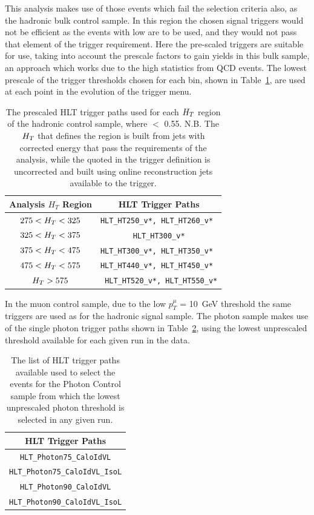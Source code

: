 This analysis makes use of those events which fail the \alt selection criteria also, as the hadronic bulk control sample. In this region the chosen signal triggers would not be efficient as the events with low \MHT are to be used, and they would not pass that element of the trigger requirement. Here the pre-scaled \HT triggers are suitable for use, taking into account the prescale factors to gain yields in this bulk sample, an approach which works due to the high statistics from QCD events. The lowest prescale of the trigger thresholds chosen for each \HT bin, shown in Table~\ref{tab:bulktrig}, are used at each point in the evolution of the trigger menu.


\begin{table}[htbp]
\centering
\begin{tabular}{ c c }
\hline
\hline
Analysis $H_{T}$ Region & HLT Trigger Paths\\
\hline
\hline
$275 < H_{T} < 325$ & \verb!HLT_HT250_v*, HLT_HT260_v* !\\
$325 < H_{T} < 375$ & \verb!HLT_HT300_v*!\\
$375 < H_{T} < 475$ & \verb!HLT_HT300_v*, HLT_HT350_v* !\\
$475 < H_{T} < 575$ &\verb!HLT_HT440_v*, HLT_HT450_v* !\\
$H_{T} > 575$ & \verb! HLT_HT520_v*, HLT_HT550_v*!\\
\hline
\end{tabular}
\caption{\label{tab:bulktrig}The prescaled HLT trigger paths used for each $H_{T}$ region of the hadronic control sample, where \alt $<$ 0.55. N.B. The $H_{T}$ that defines the region is built from jets with corrected energy that pass the requirements of the analysis, while the \HT quoted in the trigger definition is uncorrected and built using online reconstruction jets available to the trigger.}
\end{table}



In the muon control sample, due to the low $p^{\mu}_{T}$ = 10~GeV threshold the same triggers are used as for the hadronic signal sample. The photon sample makes use of the single photon trigger paths shown in Table~\ref{tab:photrig}, using the lowest unprescaled threshold available for each given run in the data.
\begin{table}[htbp]
\centering
\begin{tabular}{ c }
\hline
\hline
HLT Trigger Paths\\
\hline
\hline
\verb!HLT_Photon75_CaloIdVL!\\
\verb!HLT_Photon75_CaloIdVL_IsoL!\\
\verb!HLT_Photon90_CaloIdVL!\\
\verb!HLT_Photon90_CaloIdVL_IsoL!\\
\hline
\end{tabular}
\caption{\label{tab:photrig}The list of HLT trigger paths available used to select the events for the Photon Control sample from which the lowest unprescaled photon threshold is selected in any given run.}
\end{table}


